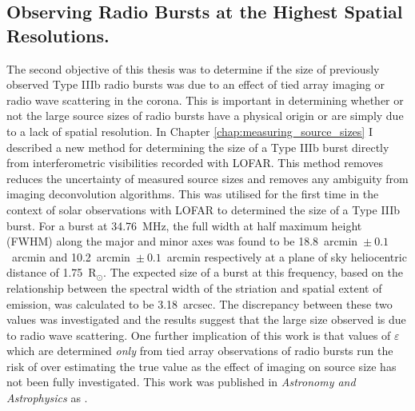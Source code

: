 \subsection{Observing Radio Bursts at the Highest Spatial Resolutions.}
The second objective of this thesis was to determine if the size of previously observed Type IIIb radio bursts was due to an effect of tied array imaging or radio wave scattering in the corona. 
This is important in determining whether or not the large source sizes of radio bursts have a physical origin or are simply due to a lack of spatial resolution. 
In Chapter \ref{chap:measuring_source_sizes} I described a new method for determining the size of a Type IIIb burst directly from interferometric visibilities recorded with LOFAR. This method removes reduces the uncertainty of measured source sizes and removes any ambiguity from imaging deconvolution algorithms.
This was utilised for the first time in the context of solar observations with LOFAR to determined the size of a Type IIIb burst. For a burst at 34.76~MHz, the full width at half maximum height (FWHM) along the major and minor axes was found to be 18.8~arcmin~$\pm~0.1$~arcmin and 10.2~arcmin~$\pm~0.1$~arcmin respectively at a plane of sky heliocentric distance of 1.75~R$_\odot$. The expected size of a burst at this frequency, based on the relationship between the spectral width of the striation and spatial extent of emission, was calculated to be 3.18~arcsec. The discrepancy between these two values was investigated and the results suggest that the large size observed is due to radio wave scattering. One further implication of this work is that values of $\varepsilon$ which are determined \textit{only} from tied array observations of radio bursts run the risk of over estimating the true value as the effect of imaging on source size has not been fully investigated. This work was published in \textit{Astronomy and Astrophysics} as \cite{Murphy2021}.

